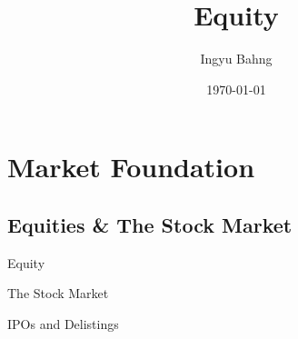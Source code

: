 \documentclass[10pt]{article}
\title{Equity}
\date{\today}
\author{Ingyu Bahng}
\begin{document}


\section{Market Foundation}

  \subsection{Equities \& The Stock Market}

    \begin{core}{Equity}


    \end{core}

    \begin{core}{The Stock Market}



    \end{core}

    \begin{core}{IPOs and Delistings}



    \end{core}
\end{document}
